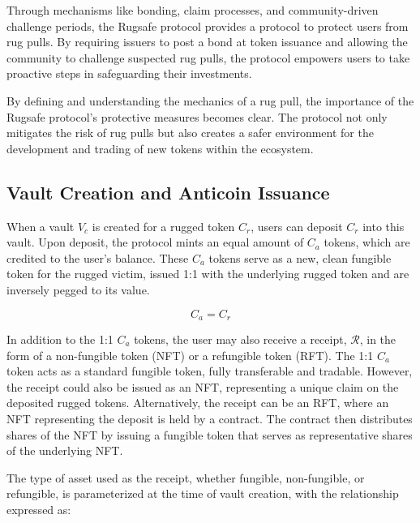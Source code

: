 \documentclass{article}
\begin{document}
Through mechanisms like bonding, claim processes, and community-driven challenge periods, the Rugsafe protocol provides a protocol to protect users from rug pulls. By requiring issuers to post a bond at token issuance and allowing the community to challenge suspected rug pulls, the protocol empowers users to take proactive steps in safeguarding their investments.

By defining and understanding the mechanics of a rug pull, the importance of the Rugsafe protocol's protective measures becomes clear. The protocol not only mitigates the risk of rug pulls but also creates a safer environment for the development and trading of new tokens within the ecosystem.










\subsection{Vault Creation and Anticoin Issuance}
When a vault $V_c$ is created for a rugged token $C_r$, users can deposit $C_r$ into this vault. Upon deposit, the protocol mints an equal amount of $C_a$ tokens, which are credited to the user's balance. These $C_a$ tokens serve as a new, clean fungible token for the rugged victim, issued 1:1 with the underlying rugged token and are inversely pegged to its value.

\begin{equation}
C_a = C_r
\end{equation}

In addition to the 1:1 $C_a$ tokens, the user may also receive a receipt, \(\mathcal{R} \), in the form of a non-fungible token (NFT) or a refungible token (RFT). The 1:1 $C_a$ token acts as a standard fungible token, fully transferable and tradable. However, the receipt could also be issued as an NFT, representing a unique claim on the deposited rugged tokens. Alternatively, the receipt can be an RFT, where an NFT representing the deposit is held by a contract. The contract then distributes shares of the NFT by issuing a fungible token that serves as representative shares of the underlying NFT.

The type of asset used as the receipt, whether fungible, non-fungible, or refungible, is parameterized at the time of vault creation, with the relationship expressed as:
\end{document}
